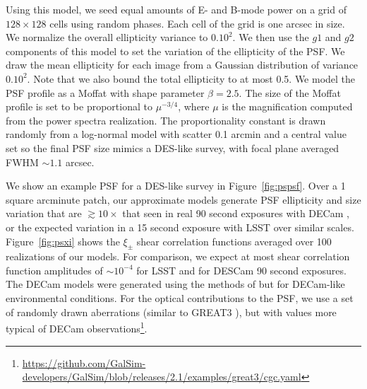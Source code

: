 \documentclass[fleqn,useAMS,usenatbib]{mnras}
\begin{document}
Using this model, we seed equal amounts of E- and B-mode power on a grid of
$128\times128$ cells using random phases. Each cell of the grid is one
arcsec in size. We normalize the overall ellipticity variance to $0.10^2$. We then use
the $g1$ and $g2$ components of this model to set the variation of the ellipticity of
the PSF. We draw the mean ellipticity for each image from a Gaussian distribution of
variance $0.10^2$. Note that we also bound the total ellipticity to at most 0.5.
We model the PSF profile as a Moffat with shape parameter $\beta=2.5$.
The size of the Moffat profile is set to be proportional to $\mu^{-3/4}$,
where $\mu$ is the magnification computed from the power spectra realization. The
proportionality constant is drawn randomly from a log-normal model with
scatter 0.1 arcmin and a central value set so the final PSF size mimics a DES-like
survey, with focal plane averaged FWHM $\sim1.1$ arcsec.

We show an example PSF for a DES-like survey in Figure~\ref{fig:pspsf}.  Over a
1 square arcminute patch, our approximate models generate PSF ellipticity and size
variation that are $\gtrsim10\times$ that seen in real 90 second exposures
with DECam \citep{DESY1shear}, or the expected variation in a 15 second exposure with
LSST \citep{jee2011} over similar scales. Figure~\ref{fig:psxi} shows the $\xi_{\pm}$ shear correlation
functions averaged over 100 realizations of our models. For comparison, we
expect at most shear correlation function amplitudes of $\sim10^{-4}$ for LSST
\citep{jee2011} and for DESCam 90 second exposures. The DECam models were generated
using the methods of \citet{jee2011} but for DECam-like environmental conditions. For
the optical contributions to the PSF, we use a set of randomly drawn
aberrations (similar to GREAT3 \citep{great3}), but with values more typical of
DECam observations\footnote{\url{https://github.com/GalSim-developers/GalSim/blob/releases/2.1/examples/great3/cgc.yaml}}.


\bsp
\label{lastpage}
\end{document}
